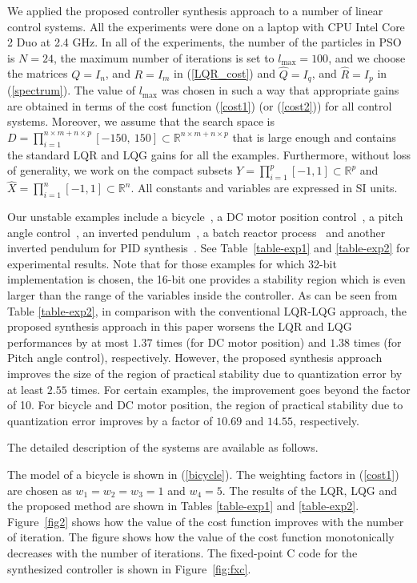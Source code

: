 \documentclass{amsart}
\numberwithin{equation}{section}
\def\myparagraph#1{{\smallskip\noindent{\bf #1}}}
\newcommand{\R}{{\mathbb{R}}}
\begin{document}
We applied the proposed controller synthesis approach to a number of linear control systems. 
All the experiments were done on a laptop with CPU Intel Core 2 Duo at 2.4 GHz. 
In all of the experiments, the number of the particles in PSO is $N=24$, 
the maximum number of iterations is set to $l_{\max}=100$, 
and we choose the matrices $Q=I_n$, and $R=I_m$ in (\ref{LQR_cost}) and $\widehat{Q}=I_q$, and $\widehat{R}=I_p$ in (\ref{spectrum}). The value of $l_{\max}$ was chosen in such a way that appropriate gains are obtained in terms of the cost function (\ref{cost1}) (or (\ref{cost2})) for all control systems.
Moreover, we assume that the search space is $D=\prod_{i=1}^{n\times{m}+n\times{p}} [-150,~150]\subset\R^{n\times{m}+n\times{p}}$ that is large enough and contains the standard LQR and LQG gains for all the examples. Furthermore, without loss of generality, we work on the compact subsets $Y=\prod_{i=1}^p [-1,1]\subset\R^p$ and $\widehat{X}=\prod_{i=1}^n [-1,1]\subset\R^n$. All constants and variables are expressed in SI units. 

Our unstable examples include a bicycle~\cite{astrom}, a DC motor position control~\cite{cmu_examples}, a pitch angle control~\cite{cmu_examples}, an inverted pendulum~\cite{cmu_examples}, a batch reactor process~\cite{green} and another inverted pendulum for PID synthesis~\cite{cmu_examples}. See Table~\ref{table-exp1} and \ref{table-exp2} for experimental results. Note that for those examples for which 32-bit implementation is chosen, the 16-bit one provides a stability region which is even larger than the range of the variables inside the controller. As can be seen from Table \ref{table-exp2}, in comparison with the conventional LQR-LQG approach, the proposed synthesis approach in this paper worsens the LQR and LQG performances by at most $1.37$ times (for
DC motor position) and $1.38$ times (for Pitch angle control), respectively. 
However, the proposed synthesis approach improves the size of the region of practical stability due to quantization error by at least $2.55$ times. For certain examples, the improvement goes beyond the factor of 10. For bicycle  and DC motor position, the region of practical stability due to quantization error improves by a factor of $10.69$ and $14.55$, respectively. 

The detailed description of the systems are available as follows. 

\myparagraph{Bicycle}
The model of a bicycle is shown in (\ref{bicycle}). The weighting factors in (\ref{cost1}) are chosen as $w_1=w_2=w_3=1$ and $w_4=5$. The results of the LQR, LQG and the proposed method are shown in Tables \ref{table-exp1} and \ref{table-exp2}.
Figure~\ref{fig2} shows how the value of the cost function improves with the number of iteration. The figure shows how
the value of the cost function monotonically decreases with the number of iterations. The fixed-point C code
for the synthesized controller is shown in Figure~\ref{fig:fxc}.
\end{document}
